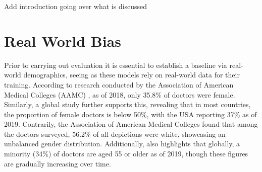 Add introduction going over what is discussed
\section{Real World Bias}\label{Eval-RealWorldBias}
{


}
Prior to carrying out evaluation it is essential to establish a baseline via real-world demographics, seeing as these models rely on real-world data for their training. According to research conducted by the Association of American Medical Colleges (AAMC) \cite{aamc_physicians_sex_2018}, as of 2018, only 35.8\% of doctors were female. Similarly, a global study \cite{oecd_home_2021} further supports this, revealing that in most countries, the proportion of female doctors is below 50\%, with the USA reporting 37\% as of 2019. Contrarily, the Association of American Medical Colleges \cite{aamc2018} found that among the doctors surveyed, 56.2\% of all depictions were white, showcasing an unbalanced gender distribution. Additionally, \cite{oecd_home_2021} also highlights that globally, a minority (34\%) of doctors are aged 55 or older as of 2019, though these figures are gradually increasing over time.

